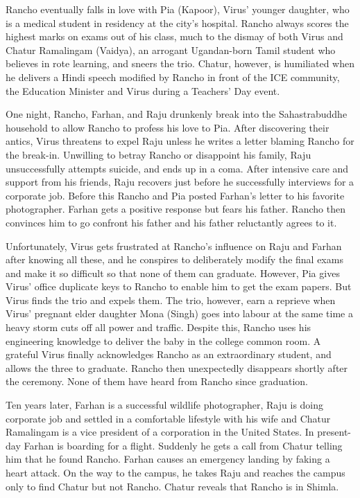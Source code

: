 \documentclass{Article}
\begin{document}
Rancho eventually falls in love with Pia (Kapoor), Virus' younger daughter, who is a medical student in residency at the city's hospital. Rancho always scores the highest marks on exams out of his class, much to the dismay of both Virus and Chatur Ramalingam (Vaidya), an arrogant Ugandan-born Tamil student who believes in rote learning, and sneers the trio. Chatur, however, is humiliated when he delivers a Hindi speech modified by Rancho in front of the ICE community, the Education Minister and Virus during a Teachers' Day event.

One night, Rancho, Farhan, and Raju drunkenly break into the Sahastrabuddhe household to allow Rancho to profess his love to Pia. After discovering their antics, Virus threatens to expel Raju unless he writes a letter blaming Rancho for the break-in. Unwilling to betray Rancho or disappoint his family, Raju unsuccessfully attempts suicide, and ends up in a coma. After intensive care and support from his friends, Raju recovers just before he successfully interviews for a corporate job. Before this Rancho and Pia posted Farhan's letter to his favorite photographer. Farhan gets a positive response but fears his father. Rancho then convinces him to go confront his father and his father reluctantly agrees to it.

Unfortunately, Virus gets frustrated at Rancho's influence on Raju and Farhan after knowing all these, and he conspires to deliberately modify the final exams and make it so difficult so that none of them can graduate. However, Pia gives Virus' office duplicate keys to Rancho to enable him to get the exam papers. But Virus finds the trio and expels them. The trio, however, earn a reprieve when Virus' pregnant elder daughter Mona (Singh) goes into labour at the same time a heavy storm cuts off all power and traffic. Despite this, Rancho uses his engineering knowledge to deliver the baby in the college common room. A grateful Virus finally acknowledges Rancho as an extraordinary student, and allows the three to graduate. Rancho then unexpectedly disappears shortly after the ceremony. None of them have heard from Rancho since graduation.

Ten years later, Farhan is a successful wildlife photographer, Raju is doing corporate job and settled in a comfortable lifestyle with his wife and Chatur Ramalingam is a vice president of a corporation in the United States. In present-day Farhan is boarding for a flight. Suddenly he gets a call from Chatur telling him that he found Rancho. Farhan causes an emergency landing by faking a heart attack. On the way to the campus, he takes Raju and reaches the campus only to find Chatur but not Rancho. Chatur reveals that Rancho is in Shimla.
\end{document}
